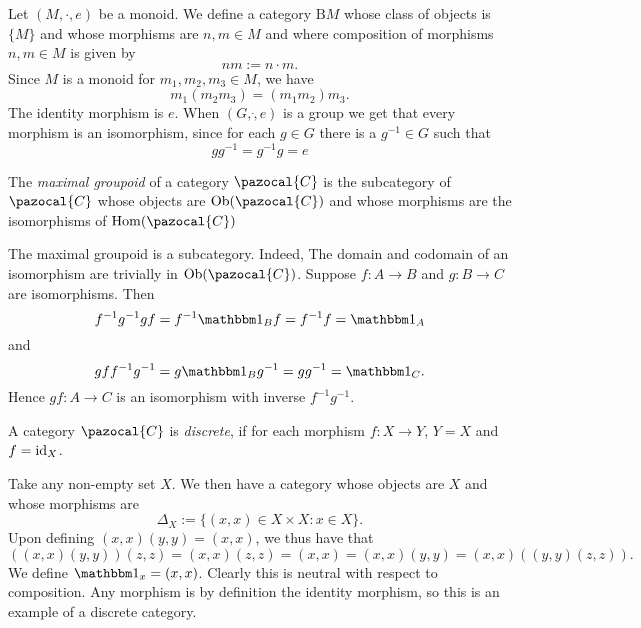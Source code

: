 \begin{example}\label{MonoidIsACategoryGroupIsGroupoid}
    Let $(M,\cdot,e)$ be a monoid. We define a category $\mathrm{B}M$ whose class of objects is $\{M\}$ and whose morphisms are $n,m\in M$ and where composition of morphisms $n,m\in M$ is given by 
    $$nm := n\cdot m.$$  
    Since $M$ is a monoid for $m_1,m_2,m_3\in M$, we have 
    $$m_1(m_2m_3)=(m_1m_2)m_3.$$
    The identity morphism is $e$. When $(G,\dot,e)$ is a group we get that every morphism is an isomorphism, since for each $g\in G$ there is a $g^{-1}\in G$ such that 
    $$gg^{-1}=g^{-1}g = e$$ 
\end{example}
\begin{definition}
    The \textit{maximal groupoid} of a category $\pazocal{C}$ is the subcategory of $\pazocal{C}$ whose objects are $\Ob(\pazocal{C})$ and whose morphisms are the isomorphisms of $\Hom(\pazocal{C})$
\end{definition}
\begin{remark}
    The maximal groupoid is a subcategory. Indeed, The domain and codomain of an isomorphism are trivially in $\Ob(\pazocal{C})$. Suppose $f:A\rightarrow B$ and $g: B \rightarrow C$ are isomorphisms. Then 
    $$f^{-1}g^{-1}gf=f^{-1}\fone_B f = f^{-1}f = \fone_A$$
    and 
    $$gff^{-1}g^{-1} = g\fone_B g^{-1} = gg^{-1} = \fone_C.$$
    Hence $gf: A \rightarrow C$ is an isomorphism with inverse $f^{-1}g^{-1}$. 
\end{remark}
\begin{definition}
    A category $\pazocal{C}$ is \emph{discrete}, if for each morphism $f:X\rightarrow Y$, $Y=X$ and $f=\mathrm{id}_X$.
\end{definition}
\begin{example}
    Take any non-empty set $X$. We then have a category whose objects are $X$ and whose morphisms are 
    $$\Delta_X := \{ (x,x) \in X\times X : x\in X\}.$$
    Upon defining $(x,x)(y,y)= (x,x)$, we thus have that 
    $$
        ((x,x)(y,y))(z,z)=(x,x)(z,z)= (x,x) = (x,x)(y,y)=(x,x)((y,y)(z,z)).
    $$
    We define $\fone_x = (x,x)$. Clearly this is neutral with respect to composition. Any morphism is by definition the identity morphism, so this is an example of a discrete category. 
\end{example}
